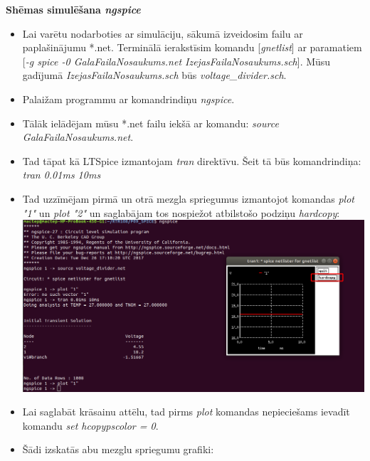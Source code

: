 \documentclass[12pt,a4paper]{report}
\begin{document}
{\large\bfseries Shēmas simulēšana \emph{ngspice}\par}
\begin{itemize}
    \item Lai varētu nodarboties ar simulāciju, sākumā izveidosim failu ar paplašinājumu *.net. Terminālā ierakstīsim komandu [\emph{gnetlist}] ar paramatiem [\emph{-g spice -0 GalaFailaNosaukums.net IzejasFailaNosaukums.sch}]. Mūsu gadījumā \emph{IzejasFailaNosaukums.sch} būs \emph{voltage\_divider.sch}.\\
    \item Palaižam programmu ar komandrindiņu \emph{ngspice}.\\
    \item Tālāk ielādējam mūsu *.net failu iekšā ar komandu: \emph{source GalaFailaNosaukums.net}.\\
    \item Tad tāpat kā LTSpice izmantojam \emph{tran} direktīvu. Šeit tā būs komandrindiņa: \emph{tran 0.01ms 10ms}\\
    \item Tad uzzīmējam pirmā un otrā mezgla spriegumus izmantojot komandas \emph{plot "1"} un \emph{plot "2"} un saglabājam tos nospiežot atbilstošo podziņu \emph{hardcopy}:\\
          \includegraphics[scale=0.3]{5}\\
    \item Lai saglabāt krāsainu attēlu, tad pirms \emph{plot} komandas nepieciešams ievadīt komandu \emph{set hcopypscolor = 0}.\\
    \item Šādi izskatās abu mezglu spriegumu grafiki:\\

\end{itemize}
\end{document}
